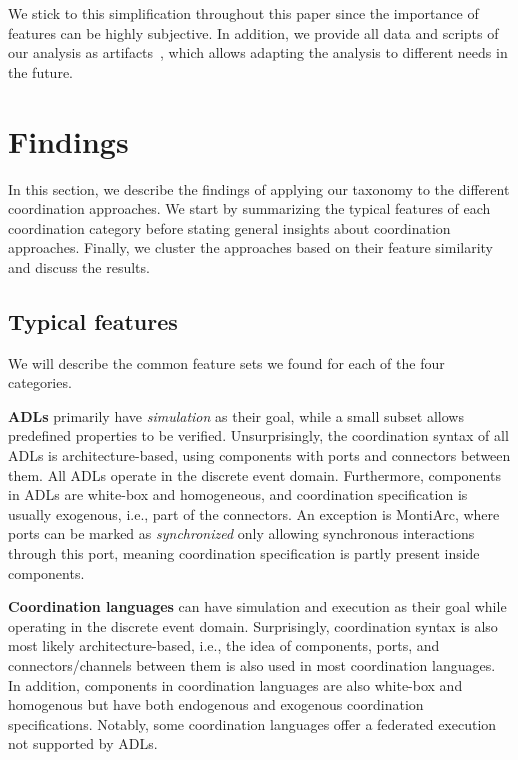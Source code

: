 \documentclass[runningheads]{llncs}
\begin{document}
We stick to this simplification throughout this paper since the importance of features can be highly subjective.
In addition, we provide all data and scripts of our analysis as artifacts~\cite{timkrauterArtifactsCoordination2024}, which allows adapting the analysis to different needs in the future.

\section{Findings} \label{sec: findings}

In this section, we describe the findings of applying our taxonomy to the different coordination approaches.
We start by summarizing the typical features of each coordination category before stating general insights about coordination approaches.
Finally, we cluster the approaches based on their feature similarity and discuss the results.

\subsection{Typical features}
We will describe the common feature sets we found for each of the four categories.

\textbf{ADLs} primarily have \textit{simulation} as their goal, while a small subset allows predefined properties to be verified.
Unsurprisingly, the coordination syntax of all ADLs is architecture-based, using components with ports and connectors between them.
All ADLs operate in the discrete event domain.
Furthermore, components in ADLs are white-box and homogeneous, and coordination specification is usually exogenous, i.e., part of the connectors.
An exception is MontiArc, where ports can be marked as \textit{synchronized} only allowing synchronous interactions through this port, meaning coordination specification is partly present inside components.

\textbf{Coordination languages} can have simulation and execution as their goal while operating in the discrete event domain.
Surprisingly, coordination syntax is also most likely architecture-based, i.e., the idea of components, ports, and connectors/channels between them is also used in most coordination languages.
In addition, components in coordination languages are also white-box and homogenous but have both endogenous and exogenous coordination specifications.
Notably, some coordination languages offer a federated execution not supported by ADLs.
\end{document}
